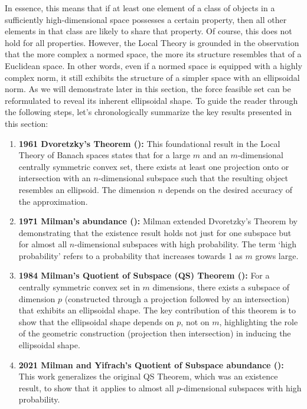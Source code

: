 In essence, this means that if at least one element of a class of objects in a sufficiently high-dimensional space possesses a certain property, then all other elements in that class are likely to share that property. Of course, this does not hold for all properties. However, the Local Theory is grounded in the observation that the more complex a normed space, the more its structure resembles that of a Euclidean space. In other words, even if a normed space is equipped with a highly complex norm, it still exhibits the structure of a simpler space with an ellipsoidal norm. As we will demonstrate later in this section, the force feasible set can be reformulated to reveal its inherent ellipsoidal shape.
To guide the reader through the following steps, let's chronologically summarize the key results presented in this section:

\begin{enumerate}
  \item {\textbf{1961 Dvoretzky's Theorem (\cite{dvoretzkyTHEOREMCONVEXBODIES1961}):} This foundational result in the Local Theory of Banach spaces states that for a large $m$ and an $m$-dimensional centrally symmetric convex set, there exists at least one projection onto or intersection with an $n$-dimensional subspace such that the resulting object resembles an ellipsoid. The dimension $n$ depends on the desired accuracy of the approximation.}
  \item {\textbf{1971 Milman's abundance (\cite{milmanAsymptoticTheoryFinite2001}):}  Milman extended Dvoretzky's Theorem by demonstrating that the existence result holds not just for one subspace but for almost all $n$-dimensional subspaces with high probability. The term `high probability' refers to a probability that increases towards 1 as $m$ grows large.}
  \item {\textbf{1984 Milman's Quotient of Subspace (QS) Theorem (\cite{milmanAlmostEuclideanQuotient}):}  For a centrally symmetric convex set in $m$ dimensions, there exists a subspace of dimension $p$ (constructed through a projection followed by an intersection) that exhibits an ellipsoidal shape. The key contribution of this theorem is to show that the ellipsoidal shape depends on $p$, not on $m$, highlighting the role of the geometric construction (projection then intersection) in inducing the ellipsoidal shape.}
  \item {\textbf{2021 Milman and Yifrach's Quotient of Subspace abundance (\cite{milmanRegularRandomSections2021}):}  This work generalizes the original QS Theorem, which was an existence result, to show that it applies to almost all $p$-dimensional subspaces with high probability.}
\end{enumerate}

